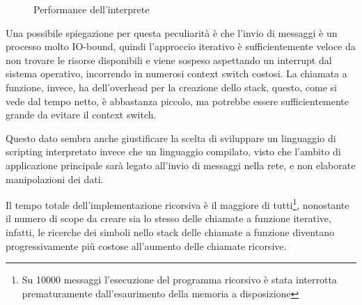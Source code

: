 \documentclass[10pt]{article}
\begin{document}
\begin{figure}
	\centering
	\caption{Performance dell'interprete}
	\label{fig:performance-graph}
\end{figure}

Una possibile spiegazione per questa peculiarità è che l'invio di messaggi è un processo molto IO-bound, quindi l'approccio iterativo è sufficientemente veloce da non trovare le risorse disponibili e viene sospeso aspettando un interrupt dal sistema operativo, incorrendo in numerosi context switch costosi. La chiamata a funzione, invece, ha dell'overhead per la creazione dello stack, questo, come si vede dal tempo netto, è abbastanza piccolo, ma potrebbe essere sufficientemente grande da evitare il context switch.

Questo dato sembra anche giustificare la scelta di sviluppare un linguaggio di scripting interpretato invece che un linguaggio compilato, visto che l'ambito di applicazione principale sarà legato all'invio di messaggi nella rete, e non elaborate manipolazioni dei dati.

Il tempo totale dell'implementazione ricorsiva è il maggiore di tutti\footnote{Su 10000 messaggi l'esecuzione del programma ricorsivo è stata interrotta prematuramente dall'esaurimento della memoria a disposizione}, nonostante il numero di scope da creare sia lo stesso delle chiamate a funzione iterative, infatti, le ricerche dei simboli nello stack delle chiamate a funzione diventano progressivamente più costose all'aumento delle chiamate ricorsive.
\end{document}
